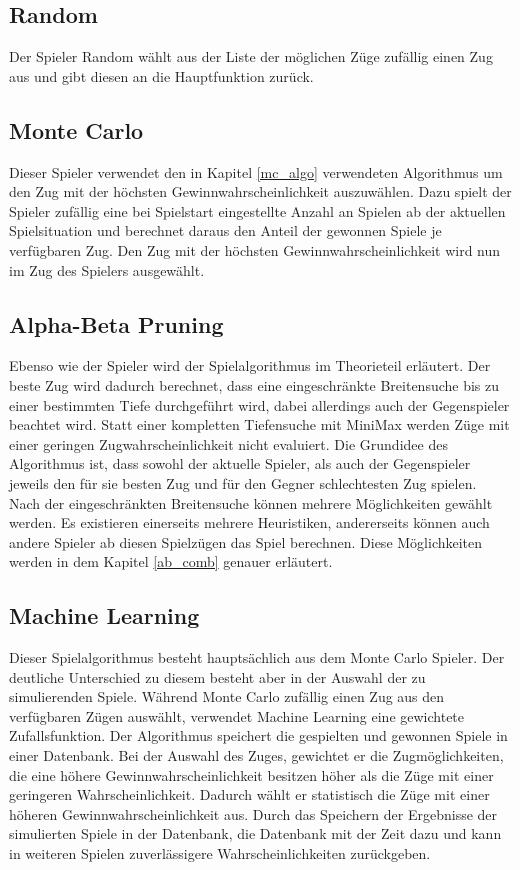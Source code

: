 \subsection{Random}
Der Spieler Random wählt aus der Liste der möglichen Züge zufällig einen Zug aus und gibt diesen an die Hauptfunktion zurück.

\subsection{Monte Carlo}
Dieser Spieler verwendet den in Kapitel \ref{mc_algo} verwendeten Algorithmus um den Zug mit der höchsten Gewinnwahrscheinlichkeit auszuwählen. Dazu spielt der Spieler zufällig eine bei Spielstart eingestellte Anzahl an Spielen ab der aktuellen Spielsituation und berechnet daraus den Anteil der gewonnen Spiele je verfügbaren Zug. Den Zug mit der höchsten Gewinnwahrscheinlichkeit wird nun im  Zug des Spielers ausgewählt.

\subsection{Alpha-Beta Pruning}
Ebenso wie der Spieler  wird der Spielalgorithmus im Theorieteil erläutert. Der beste Zug wird dadurch berechnet, dass eine eingeschränkte Breitensuche bis zu einer bestimmten Tiefe durchgeführt wird, dabei allerdings auch der Gegenspieler beachtet wird.
Statt einer kompletten Tiefensuche mit MiniMax werden Züge mit einer geringen Zugwahrscheinlichkeit nicht evaluiert. Die Grundidee des Algorithmus ist, dass sowohl der aktuelle Spieler, als auch der Gegenspieler jeweils den für sie besten Zug und für den Gegner schlechtesten Zug spielen.
\\Nach der eingeschränkten Breitensuche können mehrere Möglichkeiten gewählt werden.
Es existieren einerseits mehrere Heuristiken, andererseits können auch andere Spieler ab diesen Spielzügen das Spiel berechnen. Diese Möglichkeiten werden in dem Kapitel \ref{ab_comb} genauer erläutert.

\subsection{Machine Learning}
Dieser Spielalgorithmus besteht hauptsächlich aus dem Monte Carlo Spieler. Der deutliche Unterschied zu diesem besteht aber in der Auswahl der zu simulierenden Spiele. Während Monte Carlo zufällig einen Zug aus den verfügbaren Zügen auswählt, verwendet Machine Learning eine gewichtete Zufallsfunktion. Der Algorithmus speichert die gespielten und gewonnen Spiele in einer Datenbank. Bei der Auswahl des Zuges, gewichtet er die Zugmöglichkeiten, die eine höhere Gewinnwahrscheinlichkeit besitzen höher als die Züge mit einer geringeren Wahrscheinlichkeit. Dadurch wählt er statistisch die Züge mit einer höheren Gewinnwahrscheinlichkeit aus. Durch das Speichern der Ergebnisse der simulierten Spiele in der Datenbank,  die Datenbank mit der Zeit dazu und kann in weiteren Spielen zuverlässigere Wahrscheinlichkeiten zurückgeben.

